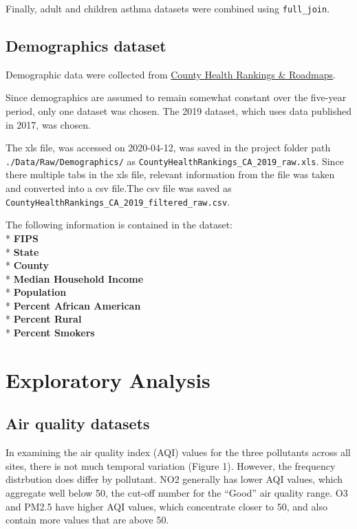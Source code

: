 \documentclass[12pt,]{article}
\begin{document}
Finally, adult and children asthma datasets were combined using
\texttt{full\_join}.

\hypertarget{demographics-dataset}{%
\subsection{Demographics dataset}\label{demographics-dataset}}

Demographic data were collected from
\href{https://www.countyhealthrankings.org/app/california/2019/downloads}{County
Health Rankings \& Roadmaps}.

Since demographics are assumed to remain somewhat constant over the
five-year period, only one dataset was chosen. The 2019 dataset, which
uses data published in 2017, was chosen.

The xls file, was accessed on 2020-04-12, was saved in the project
folder path \texttt{./Data/Raw/Demographics/} as
\texttt{CountyHealthRankings\_CA\_2019\_raw.xls}. Since there multiple
tabs in the xls file, relevant information from the file was taken and
converted into a csv file.The csv file was saved as
\texttt{CountyHealthRankings\_CA\_2019\_filtered\_raw.csv}.

The following information is contained in the dataset:\\
* \textbf{FIPS}\\
* \textbf{State}\\
* \textbf{County}\\
* \textbf{Median Household Income}\\
* \textbf{Population}\\
* \textbf{Percent African American}\\
* \textbf{Percent Rural}\\
* \textbf{Percent Smokers}

\newpage

\hypertarget{exploratory-analysis}{%
\section{Exploratory Analysis}\label{exploratory-analysis}}

\hypertarget{air-quality-datasets}{%
\subsection{Air quality datasets}\label{air-quality-datasets}}

In examining the air quality index (AQI) values for the three pollutants
across all sites, there is not much temporal variation (Figure 1).
However, the frequency distrbution does differ by pollutant. NO2
generally has lower AQI values, which aggregate well below 50, the
cut-off number for the ``Good'' air quality range. O3 and PM2.5 have
higher AQI values, which concentrate closer to 50, and also contain more
values that are above 50.
\end{document}
